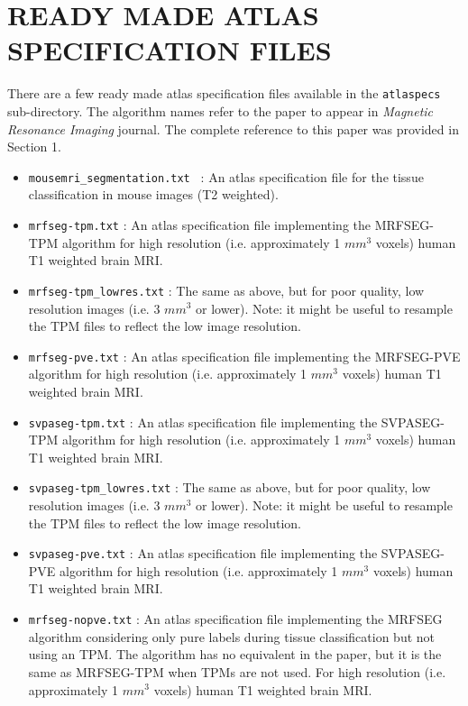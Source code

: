 \documentclass[12pt]{article}
\begin{document}
\section{READY MADE ATLAS SPECIFICATION FILES}

There are a few ready made atlas specification files available in the
{\tt atlaspecs} sub-directory. The algorithm names refer to the paper to appear in {\em Magnetic Resonance Imaging} journal. The complete reference to this paper was provided in Section 1.

\begin{itemize}
\item  {\tt mousemri\_segmentation.txt } : An atlas specification file for the tissue
classification in mouse images (T2 weighted).

\item {\tt  mrfseg-tpm.txt} :  An atlas specification file implementing the MRFSEG-TPM algorithm for high resolution (i.e. approximately 1 $mm^3$ voxels) human T1 weighted brain MRI.

\item {\tt  mrfseg-tpm\_lowres.txt} : The same as above, but for poor quality, low resolution images (i.e. 3 $mm^3$ or lower). Note: it might be useful to resample the TPM files to reflect the low image resolution. 

\item {\tt  mrfseg-pve.txt} :  An atlas specification file implementing the MRFSEG-PVE algorithm for high resolution (i.e. approximately 1 $mm^3$ voxels) human T1 weighted brain MRI.

\item {\tt svpaseg-tpm.txt} :  An atlas specification file implementing the SVPASEG-TPM algorithm for high resolution (i.e. approximately 1 $mm^3$ voxels) human T1 weighted brain MRI.

\item {\tt svpaseg-tpm\_lowres.txt} : The same as above, but for poor quality, low resolution images (i.e. 3 $mm^3$ or lower). Note: it might be useful to resample the TPM files to reflect the low image resolution. 

\item {\tt  svpaseg-pve.txt} :  An atlas specification file implementing the SVPASEG-PVE algorithm for high resolution (i.e. approximately 1 $mm^3$ voxels) human T1 weighted brain MRI.

\item {\tt  mrfseg-nopve.txt} :  An atlas specification file implementing the MRFSEG algorithm considering only pure labels during tissue classification but not using an TPM. The algorithm has no equivalent in the paper, but it is the same as MRFSEG-TPM when TPMs are not used. For high resolution (i.e. approximately 1 $mm^3$ voxels) human T1 weighted brain MRI.


\end{itemize}
\end{document}
